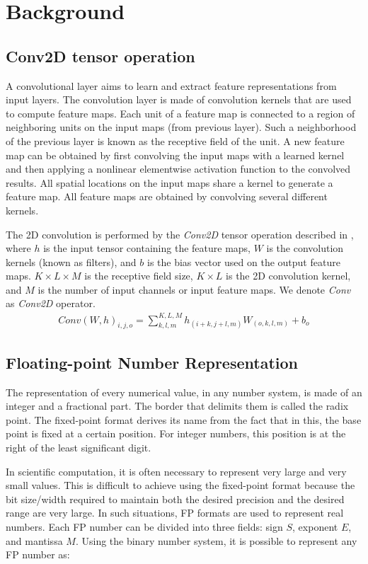 \section{Background}
\label{sec:background}

\subsection{Conv2D tensor operation}
A convolutional layer aims to learn and extract feature representations from input layers. The convolution layer is made of convolution kernels that are used to compute feature maps. Each unit of a feature map is connected to a region of neighboring units on the input maps (from previous layer). Such a neighborhood of the previous layer is known as the receptive field of the unit. A new feature map can be obtained by first convolving the input maps with a learned kernel and then applying a nonlinear elementwise activation function to the convolved results. All spatial locations on the input maps share a kernel to generate a feature map. All feature maps are obtained by convolving several different kernels\cite{gu2018recent}.


The 2D convolution is performed by the \emph{Conv2D} tensor operation described in , where $h$ is the input tensor containing the feature maps, $W$ is the convolution kernels (known as filters), and $b$ is the bias vector used on the output feature maps\cite{goodfellow2016deep}. $K\times L\times M$ is the receptive field size, $K\times L$ is the 2D convolution kernel, and $M$ is the number of input channels or input feature maps. We denote \emph{Conv} as \emph{Conv2D} operator.
\begin{eqnarray} \label{eq:conv2D}
Conv\left(W,h\right)_{i,j,o}=\sum_{k,l,m}^{K,L,M} h_{(i+k,j+l,m)} W_{(o,k,l,m)}+b_{o}
\end{eqnarray}

\subsection{Floating-point Number Representation}
The representation of every numerical value, in any number system, is made of an integer and a fractional part. The border that delimits them is called the radix point. The fixed-point format derives its name from the fact that in this, the base point is fixed at a certain position. For integer numbers, this position is at the right of the least significant digit.

In scientific computation, it is often necessary to represent very large and very small values. This is difficult to achieve using the fixed-point format because the bit size/width required to maintain both the desired precision and the desired range are very large. In such situations, FP formats are used to represent real numbers. Each FP number can be divided into three fields: sign $S$, exponent $E$, and mantissa $M$. Using the binary number system, it is possible to represent any FP number as:

